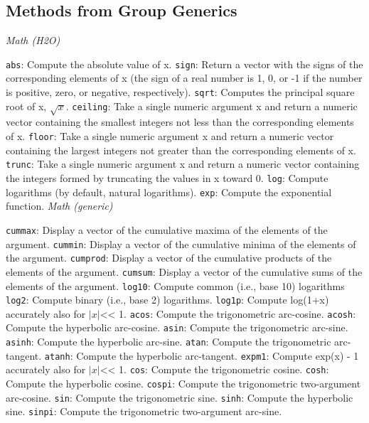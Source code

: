 {{\subsection{Methods from Group Generics}
\medskip
{\emph{Math (H2O)}}\par
{\texttt{abs}}: Compute the absolute value of x.  
{\texttt{sign}}: Return a vector with the signs of the corresponding elements of x (the sign of a real number is 1, 0, or -1 if the number is positive, zero, or negative, respectively).  
{\texttt{sqrt}}: Computes the principal square root of x, $\sqrt{x}$. 
{\texttt{ceiling}}: Take a single numeric argument x and return a numeric vector containing the smallest integers not less than the corresponding elements of x.  
{\texttt{floor}}: Take a single numeric argument x and return a numeric vector containing the largest integers not greater than the corresponding elements of x.  
{\texttt{trunc}}: Take a single numeric argument x and return a numeric vector containing the integers formed by truncating the values in x toward 0.  
{\texttt{log}}: Compute logarithms (by default, natural logarithms).  
{\texttt{exp}}: Compute the exponential function. 
\medskip
{\emph{Math (generic)}}\par
{\texttt{cummax}}: Display a vector of the cumulative maxima of the elements of the argument. 
{\texttt{cummin}}: Display a vector of the cumulative minima of the elements of the argument. 
{\texttt{cumprod}}: Display a vector of the cumulative products of the elements of the argument.  
{\texttt{cumsum}}: Display a vector of the cumulative sums of the elements of the argument.   
{\texttt{log10}}: Compute common (i.e., base 10) logarithms  
{\texttt{log2}}: Compute binary (i.e., base 2) logarithms.  
{\texttt{log1p}}: Compute log(1+x) accurately also for $|x|${}\textless{}\textless{} 1. 
{\texttt{acos}}: Compute the trigonometric arc-cosine.  
{\texttt{acosh}}: Compute the hyperbolic arc-cosine.  
{\texttt{asin}}: Compute the trigonometric arc-sine. 
{\texttt{asinh}}: Compute the hyperbolic arc-sine. 
{\texttt{atan}}: Compute the trigonometric arc-tangent.  
{\texttt{atanh}}: Compute the hyperbolic arc-tangent. 
{\texttt{expm1}}: Compute exp(x) - 1 accurately also for $|x|$\textless{}\textless{} 1. 
{\texttt{cos}}: Compute the trigonometric cosine. 
{\texttt{cosh}}: Compute the hyperbolic cosine.  
{\texttt{cospi}}: Compute the trigonometric two-argument arc-cosine.  
{\texttt{sin}}: Compute the trigonometric sine.  
{\texttt{sinh}}: Compute the hyperbolic sine.  
{\texttt{sinpi}}: Compute the trigonometric two-argument arc-sine.  
}}
